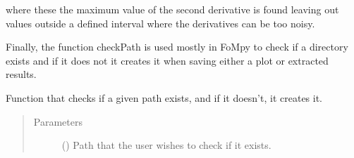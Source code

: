 \documentclass[letterpaper,10pt,english,openany, oneside]{sphinxmanual}
\begin{document}
where these the maximum value of the second derivative is found leaving out values outside a defined interval where the derivatives
can be too noisy.

Finally, the function checkPath is used mostly in FoMpy to check if a directory exists and if it does not it creates it when saving
either a plot or extracted results.

\begin{fulllineitems}
\label{\detokenize{index:fompy.aux.checkPath}}
Function that checks if a given path exists, and if it doesn’t, it creates it.
\begin{quote}\begin{description}
\item[{Parameters}] \leavevmode
{} () \textendash{} Path that the user wishes to check if it exists.

\end{description}\end{quote}

\end{fulllineitems}

\end{document}
